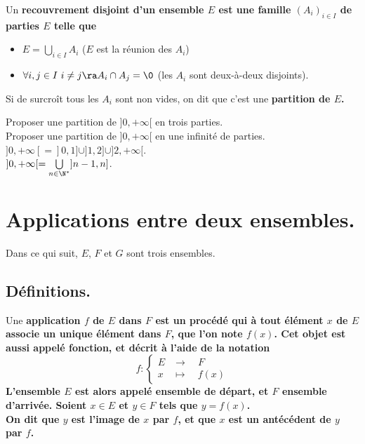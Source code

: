 \documentclass[11pt]{article}
\begin{document}
\begin{defi}{}{}
    Un \bf{recouvrement disjoint} d'un ensemble $E$ est une famille $(A_i)_{i\in I}$ de parties $E$ telle que
    \begin{itemize}
        \item $E=\bigcup\limits_{i\in I}A_i$ ($E$ est la réunion des $A_i$)
        \item $\forall i,j\in I~i\neq j\ra A_i\cap A_j = \0$ (les $A_i$ sont deux-à-deux disjoints).
    \end{itemize}
    Si de surcroît tous les $A_i$ sont non vides, on dit que c'est une \bf{partition} de $E$.
\end{defi}

\begin{ex}{}{}
    Proposer une partition de $]0,+\infty[$ en trois parties.\\
    Proposer une partition de $]0,+\infty[$ en une infinité de parties.
    \tcblower
     $]0,+\infty[=]0,1]\cup]1,2]\cup]2,+\infty[$.\\
     $]0,+\infty[=\bigcup\limits_{n\in\N^*}]n-1,n]$.
\end{ex}

\section{Applications entre deux ensembles.}

Dans ce qui suit, $E$, $F$ et $G$ sont trois ensembles.

\subsection{Définitions.}

\begin{defi}{}{}
    Une \bf{application} $f$ de $E$ dans $F$ est un procédé qui à tout élément $x$ de $E$ associe un unique élément dans $F$, que l'on note $f(x)$. Cet objet est aussi appelé \bf{fonction}, et décrit à l'aide de la notation
    \begin{equation*}
        f:\begin{cases}
            E&\to\quad F\\
            x&\mapsto\quad f(x)
        \end{cases}
    \end{equation*}
    L'ensemble $E$ est alors appelé \bf{ensemble de départ}, et $F$ \bf{ensemble d'arrivée}.\n
    Soient $x\in E$ et $y\in F$ tels que $y=f(x)$.\\
    On dit que $y$ est l'\bf{image} de $x$ par $f$, et que $x$ est un \bf{antécédent} de $y$ par $f$.
\end{defi}
\end{document}
